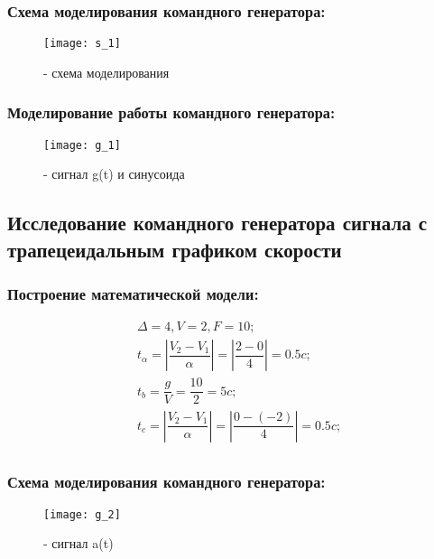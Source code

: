 \subsubsection{Схема моделирования командного генератора:}
\begin{figure}[H]
	\begin{center}
		\texttt{[image: s\_1]}
		\caption{- схема моделирования} 
		\label{pic:pic_1} %
	\end{center}
\end{figure}

\subsubsection{Моделирование работы командного генератора:}
\begin{figure}[H]
	\begin{center}
		\texttt{[image: g\_1]}
		\caption{- сигнал g(t) и синусоида} 
		\label{pic:pic_1} %
	\end{center}
\end{figure}

\subsection{Исследование командного генератора сигнала с трапецеидальным графиком скорости}
\subsubsection{Построение математической модели:}
\begin{equation}
	\begin{split}
		&\Delta=	4, V=2, F=10;\\
		&t_\alpha=\left| {\dfrac{V_2-V_1}{\alpha}} \right|=\left| {\dfrac{2-0}{4}} \right|=0.5c;\\
		&t_b=\dfrac{g}{V}=\dfrac{10}{2}=5c;\\
		&t_c=\left| {\dfrac{V_2-V_1}{\alpha}} \right|=\left| {\dfrac{0-(-2)}{4}} \right|=0.5c;\\
	\end{split}				
\end{equation}

\subsubsection{Схема моделирования командного генератора:}
\begin{figure}[H]
	\begin{center}
		\texttt{[image: g\_2]}
		\caption{- сигнал a(t)} 
		\label{pic:pic_1} %
	\end{center}
\end{figure}

